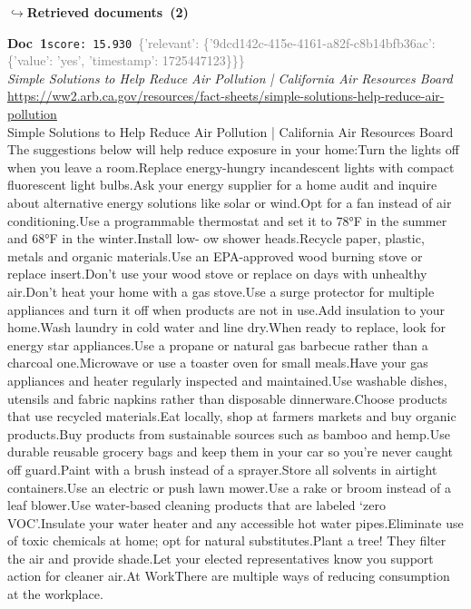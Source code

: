 \documentclass[a4paper,11pt]{article}
\begin{document}
\noindent\hfill{\footnotesize\textcolor{doccolor}{\textbf{$\hookrightarrow$\enspace Retrieved documents~(2)}}}
\begin{docenv}
{\footnotesize\textcolor{doccolor}{\textbf{Doc~1}}}\hfill{\tiny\texttt{score:~15.930}}\ {\tiny\textcolor{gray}{\{'relevant': \{'9dcd142c-415e-4161-a82f-c8b14bfb36ac': \{'value': 'yes', 'timestamp': 1725447123\}\}\}}}\\[3pt]
{\small\textit{Simple Solutions to Help Reduce Air Pollution | California Air Resources Board}}\\[2pt]
{\tiny\url{https://ww2.arb.ca.gov/resources/fact-sheets/simple-solutions-help-reduce-air-pollution}}\\[4pt]
{\footnotesize Simple Solutions to Help Reduce Air Pollution | California Air Resources Board
The suggestions below will help reduce exposure in your home:Turn the lights off when you leave a room.Replace energy-hungry incandescent lights with compact fluorescent light bulbs.Ask your energy supplier for a home audit and inquire about alternative energy solutions like solar or wind.Opt for a fan instead of air conditioning.Use a programmable thermostat and set it to 78°F in the summer and 68°F in the winter.Install low- ow shower heads.Recycle paper, plastic, metals and organic materials.Use an EPA-approved wood burning stove or replace insert.Don’t use your wood stove or replace on days with unhealthy air.Don’t heat your home with a gas stove.Use a surge protector for multiple appliances and turn it off when products are not in use.Add insulation to your home.Wash laundry in cold water and line dry.When ready to replace, look for energy star appliances.Use a propane or natural gas barbecue rather than a charcoal one.Microwave or use a toaster oven for small meals.Have your gas appliances and heater regularly inspected and maintained.Use washable dishes, utensils and fabric napkins rather than disposable dinnerware.Choose products that use recycled materials.Eat locally, shop at farmers markets and buy organic products.Buy products from sustainable sources such as bamboo and hemp.Use durable reusable grocery bags and keep them in your car so you’re never caught off guard.Paint with a brush instead of a sprayer.Store all solvents in airtight containers.Use an electric or push lawn mower.Use a rake or broom instead of a leaf blower.Use water-based cleaning products that are labeled ‘zero VOC’.Insulate your water heater and any accessible hot water pipes.Eliminate use of toxic chemicals at home; opt for natural substitutes.Plant a tree! They filter the air and provide shade.Let your elected representatives know you support action for cleaner air.At WorkThere are multiple ways of reducing consumption at the workplace.}
\end{docenv}
\end{document}
